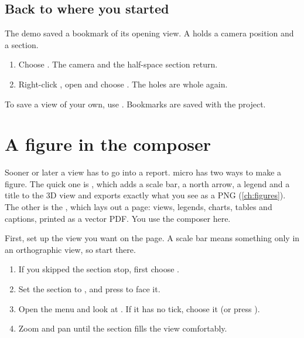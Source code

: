 \subsection{Back to where you started}
The demo saved a bookmark of its opening view. A  holds a camera position and a section.

\begin{tryit}
\begin{enumerate}
\item Choose . The camera and the half-space section return.
\item Right-click , open  and choose . The holes are whole again.
\end{enumerate}
\end{tryit}

To save a view of your own, use . Bookmarks are saved with the project.

\section{A figure in the composer}\label{sec:tour-figure}
Sooner or later a view has to go into a report. micro has two ways to make a figure. The quick one is , which adds a scale bar, a north arrow, a legend and a title to the 3D view and exports exactly what you see as a PNG (\cref{ch:figures}). The other is the , which lays out a page: views, legends, charts, tables and captions, printed as a vector PDF. You use the composer here.

First, set up the view you want on the page. A scale bar means something only in an orthographic view, so start there.

\begin{tryit}
\begin{enumerate}
\item If you skipped the section stop, first choose .
\item Set the section to , and press  to face it.
\item Open the  menu and look at . If it has no tick, choose it (or press ).
\item Zoom and pan until the section fills the view comfortably.
\end{enumerate}
\end{tryit}

